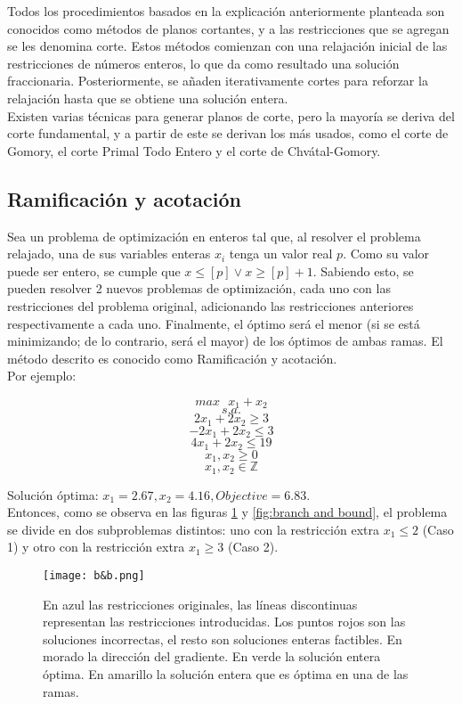 \documentclass[12pt]{report}
\begin{document}
Todos los procedimientos basados en la explicación anteriormente planteada son conocidos como métodos de planos cortantes, y a las restricciones que se agregan se les denomina corte. Estos métodos comienzan con una relajación inicial de las restricciones de números enteros, lo que da como resultado una solución fraccionaria. Posteriormente, se añaden iterativamente cortes para reforzar la relajación hasta que se obtiene una solución entera.\\

Existen varias técnicas para generar planos de corte, pero la mayoría se deriva del corte fundamental, y a partir de este se derivan los más usados, como el corte de Gomory, el corte Primal Todo Entero y el corte  de Chvátal-Gomory.\\


\subsection{Ramificación y acotación}

Sea un problema de optimización en enteros tal que, al resolver el problema relajado, una de sus variables enteras $x_i$ tenga un valor real $p$. Como su valor puede ser entero, se cumple que $x \leq  [p] \lor  x \geq  [p]+1$. Sabiendo esto, se pueden resolver 2 nuevos problemas de optimización, cada uno con las restricciones del problema original, adicionando las restricciones anteriores respectivamente a cada uno. Finalmente, el óptimo será el menor (si se está minimizando; de lo contrario, será el mayor) de los óptimos de ambas ramas. El método descrito es conocido como Ramificación y acotación. \\

Por ejemplo:

$$max \text{ } x_1 + x_2$$
$$s.a.$$
$$2x_1 + 2x_2 \geq  3$$
$$-2x_1 + 2x_2 \leq  3$$
$$4x_1 + 2x_2 \leq  19$$
$$x_1, x_2 \geq  0$$
$$x_1, x_2 \in \mathbb{Z}$$

Solución óptima: $x_1=2.67, x_2=4.16, Objective=6.83$.\\

Entonces, como se observa en las figuras \ref{fig:b&b} y \ref{fig:branch and bound}, el problema se divide en dos subproblemas distintos: uno con la restricción extra $x_1\leq 2$ (Caso 1) y otro con la restricción extra $x_1\geq 3$ (Caso 2).\\

\begin{figure}[ht]
    \centering
    \texttt{[image: b\&b.png]}
    \caption{En azul las restricciones originales, las líneas discontinuas representan las restricciones introducidas. Los puntos rojos son las soluciones incorrectas, el resto son soluciones enteras factibles. En morado la dirección del gradiente. En verde la solución entera óptima. En amarillo la solución entera que es óptima en una de las ramas.}
    \label{fig:b&b}
\end{figure}
\end{document}
